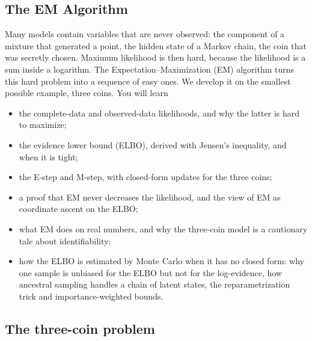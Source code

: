 \begin{notechapter}
\chapter{The EM Algorithm}\label{ch:em-algorithm}

\begin{chapterintro}
Many models contain variables that are never observed: the component of a
mixture that generated a point, the hidden state of a Markov chain, the coin
that was secretly chosen. Maximum likelihood is then hard, because the
likelihood is a sum inside a logarithm. The Expectation--Maximization (EM)
algorithm turns this hard problem into a sequence of easy ones. We develop it on
the smallest possible example, three coins. You will learn
\begin{itemize}[nosep]
  \item the complete-data and observed-data likelihoods, and why the latter is
        hard to maximize;
  \item the evidence lower bound (ELBO), derived with Jensen's inequality, and
        when it is tight;
  \item the E-step and M-step, with closed-form updates for the three coins;
  \item a proof that EM never decreases the likelihood, and the view of EM as
        coordinate ascent on the ELBO;
  \item what EM does on real numbers, and why the three-coin model is a
        cautionary tale about identifiability;
  \item how the ELBO is estimated by Monte Carlo when it has no closed form: why
        one sample is unbiased for the ELBO but not for the log-evidence, how
        ancestral sampling handles a chain of latent states, the
        reparametrization trick and importance-weighted bounds.
\end{itemize}
\end{chapterintro}

\section{The three-coin problem}\label{em-algorithm:sec:problem}


\end{notechapter}
